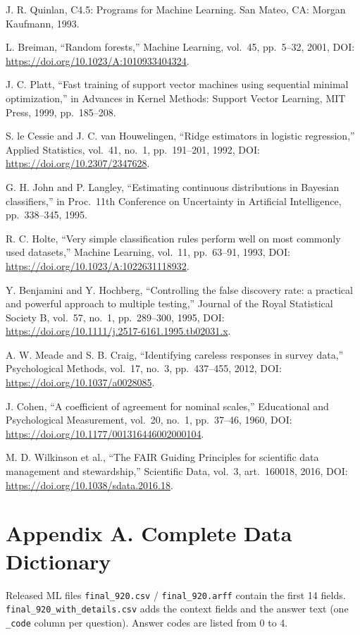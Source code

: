 \documentclass[11pt,a4paper]{article}
\begin{document}
{\begin{enumerate}[label={[\arabic*]},leftmargin=22pt,itemsep=2pt]
\item J. R. Quinlan, C4.5: Programs for Machine Learning. San Mateo, CA: Morgan Kaufmann, 1993.
\item L. Breiman, ``Random forests,'' Machine Learning, vol.\ 45, pp.\ 5--32, 2001, DOI: \url{https://doi.org/10.1023/A:1010933404324}.
\item J. C. Platt, ``Fast training of support vector machines using sequential minimal optimization,'' in Advances in Kernel Methods: Support Vector Learning, MIT Press, 1999, pp.\ 185--208.
\item S. le Cessie and J. C. van Houwelingen, ``Ridge estimators in logistic regression,'' Applied Statistics, vol.\ 41, no.\ 1, pp.\ 191--201, 1992, DOI: \url{https://doi.org/10.2307/2347628}.
\item G. H. John and P. Langley, ``Estimating continuous distributions in Bayesian classifiers,'' in Proc.\ 11th Conference on Uncertainty in Artificial Intelligence, pp.\ 338--345, 1995.
\item R. C. Holte, ``Very simple classification rules perform well on most commonly used datasets,'' Machine Learning, vol.\ 11, pp.\ 63--91, 1993, DOI: \url{https://doi.org/10.1023/A:1022631118932}.
\item Y. Benjamini and Y. Hochberg, ``Controlling the false discovery rate: a practical and powerful approach to multiple testing,'' Journal of the Royal Statistical Society B, vol.\ 57, no.\ 1, pp.\ 289--300, 1995, DOI: \url{https://doi.org/10.1111/j.2517-6161.1995.tb02031.x}.
\item A. W. Meade and S. B. Craig, ``Identifying careless responses in survey data,'' Psychological Methods, vol.\ 17, no.\ 3, pp.\ 437--455, 2012, DOI: \url{https://doi.org/10.1037/a0028085}.
\item J. Cohen, ``A coefficient of agreement for nominal scales,'' Educational and Psychological Measurement, vol.\ 20, no.\ 1, pp.\ 37--46, 1960, DOI: \url{https://doi.org/10.1177/001316446002000104}.
\item M. D. Wilkinson et al., ``The FAIR Guiding Principles for scientific data management and stewardship,'' Scientific Data, vol.\ 3, art.\ 160018, 2016, DOI: \url{https://doi.org/10.1038/sdata.2016.18}.
\end{enumerate}}

\newpage
\section{Appendix A. Complete Data Dictionary}
Released ML files \texttt{final\_920.csv} / \texttt{final\_920.arff} contain the first 14 fields. \texttt{final\_920\_with\_details.csv} adds the context fields and the answer text (one \texttt{\_code} column per question). Answer codes are listed from 0 to 4.
\end{document}
